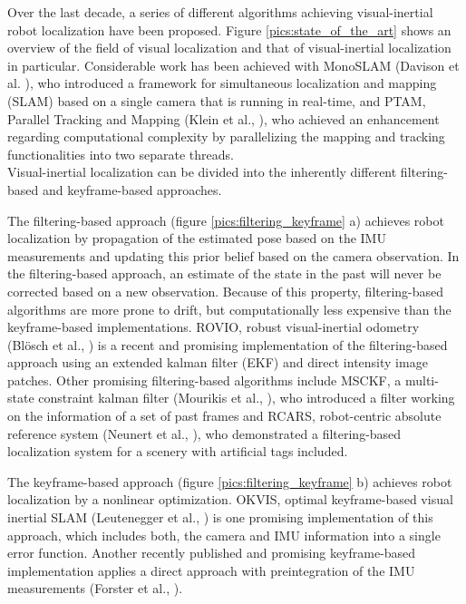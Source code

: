Over the last decade, a series of different algorithms achieving visual-inertial robot localization have been proposed. Figure \ref{pics:state_of_the_art} shows an overview of the field of visual localization and that of visual-inertial localization in particular. Considerable work has been achieved with MonoSLAM (Davison et al. \cite{davison2007monoslam}), who introduced a framework for simultaneous localization and mapping (SLAM) based on a single camera that is running in real-time, and PTAM, Parallel Tracking and Mapping (Klein et al., \cite{klein2007parallel}), who achieved an enhancement regarding computational complexity by parallelizing the mapping and tracking functionalities into two separate threads. \\

Visual-inertial localization can be divided into the inherently different filtering-based and keyframe-based approaches. 

The filtering-based approach (figure \ref{pics:filtering_keyframe} a) achieves robot localization by propagation of the estimated pose based on the IMU measurements and updating this prior belief based on the camera observation. In the filtering-based approach, an estimate of the state in the past will never be corrected based on a new observation. Because of this property, filtering-based algorithms are more prone to drift, but computationally less expensive than the keyframe-based implementations. ROVIO, robust visual-inertial odometry (Blösch et al., \cite{bloeschrobust}) is a recent and promising implementation of the filtering-based approach using an extended kalman filter (EKF) and direct intensity image patches. Other promising filtering-based algorithms include MSCKF, a multi-state constraint kalman filter (Mourikis et al., \cite{mourikis2007multi}), who introduced a filter working on the information of a set of past frames and RCARS, robot-centric absolute reference system (Neunert et al., \cite{neunert2015open}), who demonstrated a filtering-based localization system for a scenery with artificial tags included.

The keyframe-based approach (figure \ref{pics:filtering_keyframe} b) achieves robot localization by a nonlinear optimization. OKVIS, optimal keyframe-based visual inertial SLAM (Leutenegger et al., \cite{leutenegger2015keyframe}) is one promising implementation of this approach, which includes both, the camera and IMU information into a single error function. Another recently published and promising keyframe-based implementation applies a direct approach with preintegration of the IMU measurements (Forster et al., \cite{forster2015imu}).

